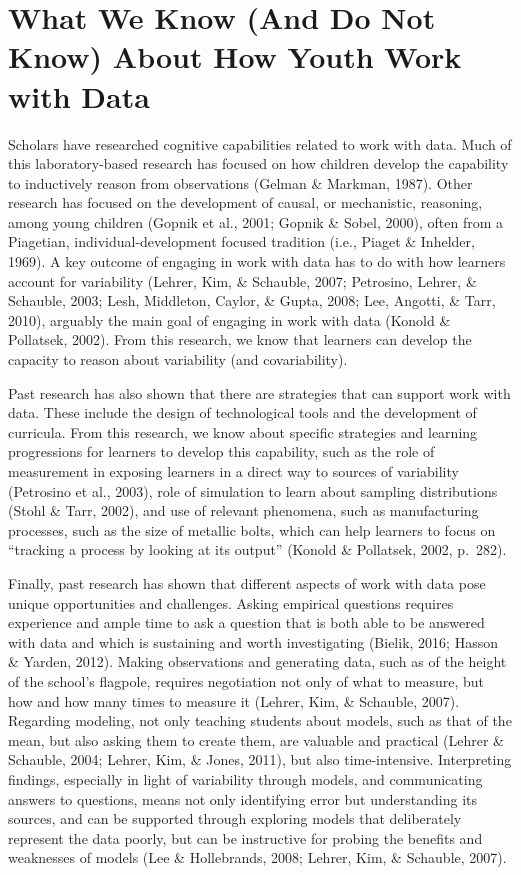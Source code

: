 \documentclass[]{book}
\theoremstyle{definition}
\theoremstyle{definition}
\theoremstyle{definition}
\theoremstyle{remark}
\begin{document}
\section{What We Know (And Do Not Know) About How Youth Work with
Data}\label{what-we-know-and-do-not-know-about-how-youth-work-with-data}

Scholars have researched cognitive capabilities related to work with
data. Much of this laboratory-based research has focused on how children
develop the capability to inductively reason from observations (Gelman
\& Markman, 1987). Other research has focused on the development of
causal, or mechanistic, reasoning, among young children (Gopnik et al.,
2001; Gopnik \& Sobel, 2000), often from a Piagetian,
individual-development focused tradition (i.e., Piaget \& Inhelder,
1969). A key outcome of engaging in work with data has to do with how
learners account for variability (Lehrer, Kim, \& Schauble, 2007;
Petrosino, Lehrer, \& Schauble, 2003; Lesh, Middleton, Caylor, \& Gupta,
2008; Lee, Angotti, \& Tarr, 2010), arguably the main goal of engaging
in work with data (Konold \& Pollatsek, 2002). From this research, we
know that learners can develop the capacity to reason about variability
(and covariability).

Past research has also shown that there are strategies that can support
work with data. These include the design of technological tools and the
development of curricula. From this research, we know about specific
strategies and learning progressions for learners to develop this
capability, such as the role of measurement in exposing learners in a
direct way to sources of variability (Petrosino et al., 2003), role of
simulation to learn about sampling distributions (Stohl \& Tarr, 2002),
and use of relevant phenomena, such as manufacturing processes, such as
the size of metallic bolts, which can help learners to focus on
``tracking a process by looking at its output'' (Konold \& Pollatsek,
2002, p.~282).

Finally, past research has shown that different aspects of work with
data pose unique opportunities and challenges. Asking empirical
questions requires experience and ample time to ask a question that is
both able to be answered with data and which is sustaining and worth
investigating (Bielik, 2016; Hasson \& Yarden, 2012). Making
observations and generating data, such as of the height of the school's
flagpole, requires negotiation not only of what to measure, but how and
how many times to measure it (Lehrer, Kim, \& Schauble, 2007). Regarding
modeling, not only teaching students about models, such as that of the
mean, but also asking them to create them, are valuable and practical
(Lehrer \& Schauble, 2004; Lehrer, Kim, \& Jones, 2011), but also
time-intensive. Interpreting findings, especially in light of
variability through models, and communicating answers to questions,
means not only identifying error but understanding its sources, and can
be supported through exploring models that deliberately represent the
data poorly, but can be instructive for probing the benefits and
weaknesses of models (Lee \& Hollebrands, 2008; Lehrer, Kim, \&
Schauble, 2007).
\end{document}
